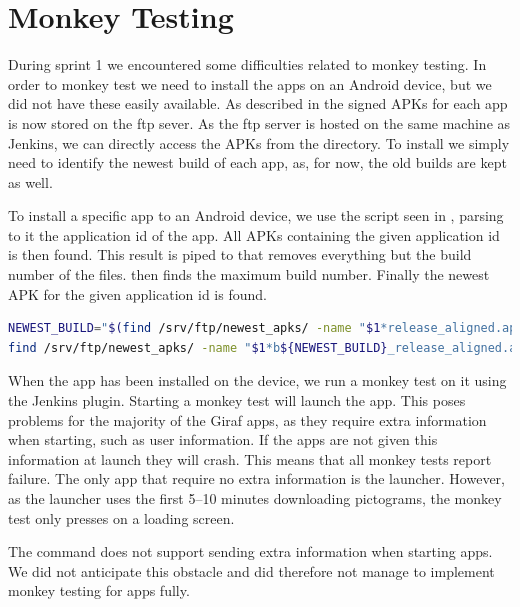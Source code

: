 \section{Monkey Testing}\label{sec:monkey_testing_s2}
During sprint 1 we encountered some difficulties related to monkey testing. In order to monkey test we need to install the apps on an Android device, but we did not have these easily available. As described in  the signed APKs for each app is now stored on the ftp sever. As the ftp server is hosted on the same machine as Jenkins, we can directly access the APKs from the directory. To install we simply need to identify the newest build of each app, as, for now, the old builds are kept as well.  

To install a specific app to an Android device, we use the script seen in , parsing to it the application id of the app. All APKs containing the given application id is then found. This result is piped to  that removes everything but the build number of the files.  then finds the maximum build number. Finally the newest APK for the given application id is found.

\begin{lstlisting}[language=bash,showstringspaces=false,caption=Script that finds the newest build number for a particular application id,label=lst:find_newest_apk]
NEWEST_BUILD="$(find /srv/ftp/newest_apks/ -name "$1*release_aligned.apk" | sed 's|.*b||' | sed 's|_release_aligned.apk||' | awk '$0>x{x=$0};END{print x}')"
find /srv/ftp/newest_apks/ -name "$1*b${NEWEST_BUILD}_release_aligned.apk"
\end{lstlisting}

When the app has been installed on the device, we run a monkey test on it using the Jenkins plugin. Starting a monkey test will launch the app. This poses problems for the majority of the Giraf apps, as they require extra information when starting, such as user information. If the apps are not given this information at launch they will crash. This means that all monkey tests report failure. The only app that require no extra information is the launcher. However, as the launcher uses the first 5--10 minutes downloading pictograms, the monkey test only presses on a loading screen.

The  command does not support sending extra information when starting apps. We did not anticipate this obstacle and did therefore not manage to implement monkey testing for apps fully.

